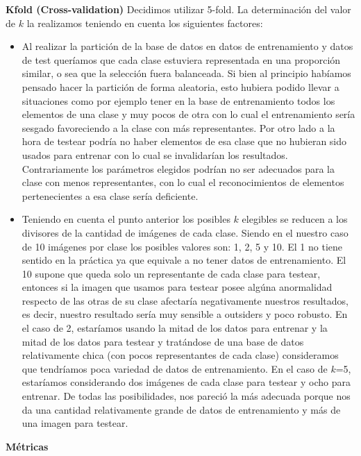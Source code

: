\textbf{Kfold (Cross-validation)}
Decidimos utilizar 5-fold.
La determinación del valor de $k$ la realizamos teniendo en cuenta los siguientes factores:
\begin{itemize}
\item Al realizar la partición de la base de datos en datos de entrenamiento y datos de test queríamos que cada clase estuviera representada en una proporción similar, o sea que la selección fuera balanceada. Si bien al principio habíamos pensado hacer la partición de forma aleatoria, esto hubiera podido llevar a situaciones como por ejemplo tener en la base de entrenamiento todos los elementos de una clase y muy pocos de otra con lo cual el entrenamiento sería sesgado favoreciendo a la clase con más representantes. Por otro lado a la hora de testear podría no haber elementos de esa clase que no hubieran sido usados para entrenar con lo cual se invalidarían los resultados. Contrariamente los parámetros elegidos podrían no ser adecuados para la clase con menos representantes, con lo cual el reconocimientos de elementos pertenecientes a esa clase sería deficiente.

\item Teniendo en cuenta el punto anterior los posibles $k$ elegibles se reducen a los divisores de la cantidad de imágenes de cada clase. Siendo en el nuestro caso de 10 imágenes por clase los posibles valores son: 1, 2, 5 y 10. El 1 no tiene sentido en la práctica ya que equivale a no tener datos de entrenamiento. El 10 supone que queda solo un representante de cada clase para testear, entonces si la imagen que usamos para testear posee algúna anormalidad respecto de las otras de su clase afectaría negativamente nuestros resultados, es decir, nuestro resultado sería muy sensible a outsiders y poco robusto. En el caso de 2, estaríamos usando la mitad de los datos para entrenar y la mitad de los datos para testear y tratándose de una base de datos relativamente chica (con pocos representantes de cada clase) consideramos que tendríamos poca variedad de datos de entrenamiento. En el caso de $k$=5, estaríamos considerando dos imágenes de cada clase para testear y ocho para entrenar. De todas las posibilidades, nos pareció la más adecuada porque nos da una cantidad relativamente grande de datos de entrenamiento y más de una imagen para testear. 
\end{itemize}

\textbf{Métricas}

